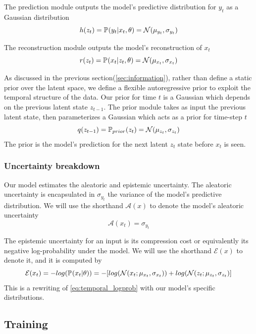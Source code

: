 \documentclass[../main.tex]{subfiles}
\begin{document}
The prediction module outputs the model's predictive distribution for $y_t$ as a Gaussian distribution
$$
    h(z_t) = \pdf{y_t| x_t, \theta} = \mathcal{N}(\mu_{y_t}, \sigma_{y_t})
$$

The reconstruction module outputs the model's reconstruction of $x_t$
$$
    r(z_t) = \pdf{x_t| z_t, \theta} = \mathcal{N}(\mu_{x_t}, \sigma_{x_t})
$$

As discussed in the previous section(\ref{sec:information}), rather than define a static prior over the latent space, we define a flexible autoregressive prior to exploit the temporal structure of the data. Our prior for time $t$ is a Gaussian which depends on the previous latent state $z_{t-1}$. The prior module takes as input the previous latent state, then parameterizes a Gaussian which acts as a prior for time-step $t$
$$
    q(z_{t-1}) = \pdf[prior]{z_t} = \mathcal{N}(\mu_{z_t}, \sigma_{z_t})
$$
The prior is the model's prediction for the next latent $z_t$ state before $x_t$ is seen. 


\subsubsection{Uncertainty breakdown}
Our model estimates the aleatoric and epistemic uncertainty. The aleatoric uncertainty is encapsulated in $\sigma_{y_t}$ the variance of the model's predictive distribution.
We will use the shorthand $\mathcal{A}(x)$ to denote the model's aleatoric uncertainty
$$
    \mathcal{A}(x_t) = \sigma_{y_t}
$$

The epistemic uncertainty for an input is its compression cost or equivalently its negative log-probability under the model. We will use the shorthand $\mathcal{E}(x)$ to denote it, and it is computed by 
$$
    \mathcal{E}(x_t) = -log(\pdf{x_t|\theta}) = -[log(\mathcal{N}(x_t; \mu_{x_t}, \sigma_{x_t}) ) + log(\mathcal{N}(z_t; \mu_{z_t}, \sigma_{z_t})]
$$
This is a rewriting of \cref{eq:temporal_logprob} with our model's specific distributions. 



\subsection{Training}
\end{document}
